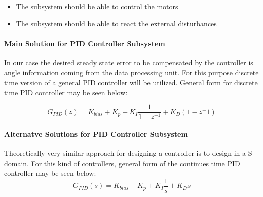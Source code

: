 \documentclass[a4paper,12pt]{article}
\begin{document}
	\begin{itemize}
		\item The subsystem should be able to control the motors
		\item The subsystem should be able to react the external disturbances
	\end{itemize} 
	
	\paragraph{Main Solution for PID Controller Subsystem}
	
		In our case the desired steady state error to be compensated by the controller is angle information coming from the data processing unit. For this purpose discrete time version of a general PID controller will be utilized. General form for discrete time PID controller may be seen below:
	
	$$ G_{PID}(z)=K_{bias}+K_p+K_I\frac{1}{1-z^{-1}}+K_D(1-z^-1)	$$
	
	
	
	
	\paragraph{Alternatve Solutions for PID Controller Subsystem}
		Theoretically very similar approach for designing a controller is to design in a S-domain. For this kind of controllers, general form of the continues time PID controller may be seen below:
		$$ G_{PID}(s)=K_{bias}+K_p+K_I\frac{1}{s}+K_Ds	$$
		
\end{document}
